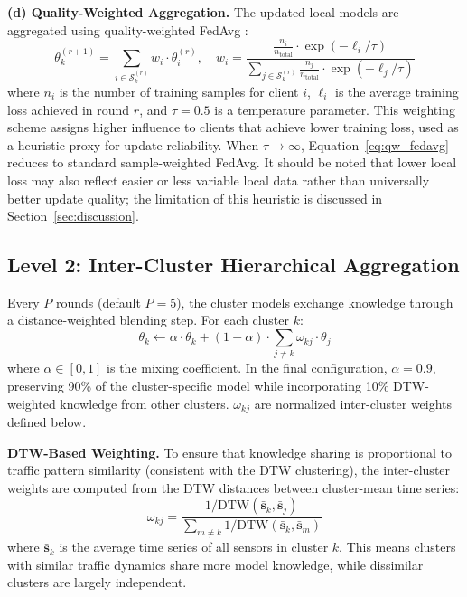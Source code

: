 \textbf{(d) Quality-Weighted Aggregation.} The updated local models are aggregated using quality-weighted FedAvg \cite{dai2024}:
\begin{equation}
\label{eq:qw_fedavg}
\theta_k^{(r+1)} = \sum_{i \in \mathcal{S}_k^{(r)}} w_i \cdot \theta_i^{(r)}, \quad w_i = \frac{\frac{n_i}{n_{\text{total}}} \cdot \exp(-\ell_i / \tau)}{\sum_{j \in \mathcal{S}_k^{(r)}} \frac{n_j}{n_{\text{total}}} \cdot \exp(-\ell_j / \tau)}
\end{equation}
where $n_i$ is the number of training samples for client $i$, $\ell_i$ is the average training loss achieved in round $r$, and $\tau = 0.5$ is a temperature parameter. This weighting scheme assigns higher influence to clients that achieve lower training loss, used as a heuristic proxy for update reliability. When $\tau \to \infty$, Equation~\ref{eq:qw_fedavg} reduces to standard sample-weighted FedAvg. It should be noted that lower local loss may also reflect easier or less variable local data rather than universally better update quality; the limitation of this heuristic is discussed in Section~\ref{sec:discussion}.


\subsection{Level 2: Inter-Cluster Hierarchical Aggregation}
\label{sec:hier_agg}
Every $P$ rounds (default $P = 5$), the cluster models exchange knowledge through a distance-weighted blending step. For each cluster $k$:
\begin{equation}
\label{eq:hier_blend}
\theta_k \leftarrow \alpha \cdot \theta_k + (1 - \alpha) \cdot \sum_{j \neq k} \omega_{kj} \cdot \theta_j
\end{equation}
where $\alpha \in [0, 1]$ is the mixing coefficient. In the final configuration, $\alpha = 0.9$, preserving 90\% of the cluster-specific model while incorporating 10\% DTW-weighted knowledge from other clusters. $\omega_{kj}$ are normalized inter-cluster weights defined below.

\textbf{DTW-Based Weighting.} To ensure that knowledge sharing is proportional to traffic pattern similarity (consistent with the DTW clustering), the inter-cluster weights are computed from the DTW distances between cluster-mean time series:
\begin{equation}
\omega_{kj} = \frac{1/\text{DTW}(\bar{\mathbf{s}}_k, \bar{\mathbf{s}}_j)}{\sum_{m \neq k} 1/\text{DTW}(\bar{\mathbf{s}}_k, \bar{\mathbf{s}}_m)}
\end{equation}
where $\bar{\mathbf{s}}_k$ is the average time series of all sensors in cluster $k$. This means clusters with similar traffic dynamics share more model knowledge, while dissimilar clusters are largely independent.

